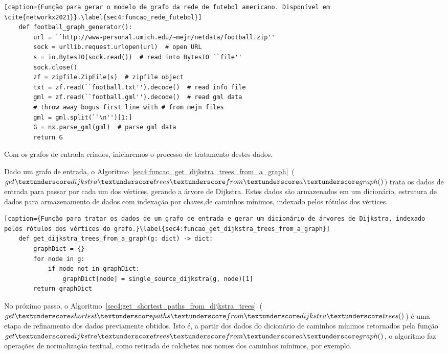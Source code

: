 \begin{lstlisting}[caption={Função para gerar o modelo de grafo da rede de futebol americano. Disponível em \cite{networkx2021}}.\label{sec4:funcao_rede_futebol}]
	def football_graph_generator():
		url = ``http://www-personal.umich.edu/~mejn/netdata/football.zip''
		sock = urllib.request.urlopen(url)  # open URL
		s = io.BytesIO(sock.read())  # read into BytesIO ``file''
		sock.close()
		zf = zipfile.ZipFile(s)  # zipfile object
		txt = zf.read(``football.txt'').decode()  # read info file
		gml = zf.read(``football.gml'').decode()  # read gml data
		# throw away bogus first line with # from mejn files
		gml = gml.split(``\n'')[1:]
		G = nx.parse_gml(gml)  # parse gml data
		return G
\end{lstlisting}

Com os grafos de entrada criados, iniciaremos o processo de tratamento destes dados.

Dado um grafo de entrada, o Algoritmo~\ref{sec4:funcao_get_dijkstra_trees_from_a_graph}~(\emph{$get\textunderscore dijkstra\textunderscore trees\textunderscore from\textunderscore a\textunderscore graph()$}) trata os dados de entrada para passar por cada um dos vértices, gerando a árvore de Dijkstra. Estes dados são armazenados em um dicionário, estrutura de dados para armazenamento de dados com indexação por chaves,de caminhos mínimos, indexado pelos rótulos dos vértices.

\begin{lstlisting}[caption={Função para tratar os dados de um grafo de entrada e gerar um dicionário de árvores de Dijkstra, indexado pelos rótulos dos vértices do grafo.}\label{sec4:funcao_get_dijkstra_trees_from_a_graph}]
	def get_dijkstra_trees_from_a_graph(g: dict) -> dict:
		graphDict = {}
		for node in g:
			if node not in graphDict:
				graphDict[node] = single_source_dijkstra(g, node)[1]
		return graphDict
\end{lstlisting}

No próximo passo, o Algoritmo~\ref{sec4:get_shortest_paths_from_dijkstra_trees}~(\emph{$get\textunderscore shortest\textunderscore paths\textunderscore from\textunderscore dijkstra\textunderscore trees()$}) é uma etapa de refinamento dos dados previamente obtidos. Isto é, a partir dos dados do dicionário de caminhos mínimos retornados pela função \emph{$get\textunderscore dijkstra\textunderscore trees\textunderscore from\textunderscore a\textunderscore graph()$}, o algoritmo faz operações de normalização textual, como retirada de colchetes nos nomes dos caminhos mínimos, por exemplo.


